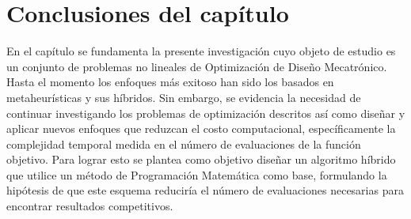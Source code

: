 \section{Conclusiones del capítulo}
  En el capítulo se fundamenta la presente investigación cuyo objeto de estudio es un conjunto de problemas no lineales de Optimización de Diseño Mecatrónico.  Hasta el momento los enfoques más exitoso han sido los basados en metaheurísticas y sus híbridos. Sin embargo, se evidencia la necesidad de continuar investigando los problemas de optimización descritos así como diseñar y aplicar nuevos enfoques que reduzcan el costo computacional, específicamente la complejidad temporal medida en el número de evaluaciones de la función objetivo. Para lograr esto se plantea como objetivo diseñar un algoritmo híbrido que utilice un método de Programación Matemática como base, formulando la hipótesis de que este esquema reduciría el número de evaluaciones necesarias para encontrar resultados competitivos. 